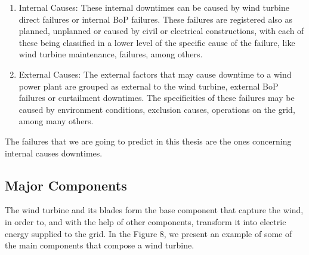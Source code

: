 
\begin{enumerate}
    \item{Internal Causes:}
These internal downtimes can be caused by wind turbine direct failures or internal \gls{BoP} failures. These failures are registered also as planned, unplanned or caused by civil or electrical constructions, with each of these being classified in a lower level of the specific cause of the failure, like wind turbine maintenance, failures, among others.

    \item{External Causes:}
The external factors that may cause downtime to a wind power plant are grouped as external to the wind turbine, external \gls{BoP} failures or curtailment downtimes. The specificities of these failures may be caused by environment conditions, exclusion causes, operations on the grid, among many others.
\end{enumerate}

The failures that we are going to predict in this thesis are the ones concerning internal causes downtimes.



\subsection{Major Components} 
\label{sub:if_you_use_this_template} 

The wind turbine and its blades form the base component that capture the wind, in order to, and with the help of other components, transform it into electric energy supplied to the grid. In the Figure 8, we present an example of some of the main components that compose a wind turbine.

